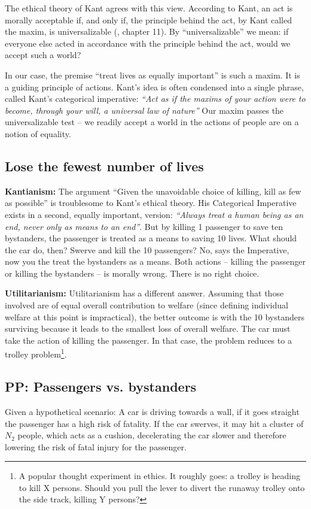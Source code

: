 The ethical theory of Kant agrees with this view. According to Kant, an act is morally acceptable if, and only if, the principle behind the act, by Kant called the maxim, is universalizable (\cite{Schafer}, chapter 11). By “universalizable” we mean: if everyone else acted in accordance with the principle behind the act, would we accept such a world?  

In our case, the premise “treat lives as equally important” is such a maxim. It is a guiding principle of actions. Kant’s idea is often condensed into a single phrase, called Kant’s categorical imperative: \textit{“Act as if the maxims of your action were to become, through your will, a universal law of nature”} Our maxim passes the universalizable test – we readily accept a world in the actions of people are on a notion of equality.


\subsection{Lose the fewest number of lives}
\textbf{Kantianism:} The argument “Given the unavoidable choice of killing, kill as few as possible” is troublesome to Kant’s ethical theory. His Categorical Imperative exists in a second, equally important, version: \textit{“Always treat a human being as an end, never only as means to an end”}. But by killing 1 passenger to save ten bystanders, the passenger is treated as a means to saving 10 lives. What should the car do, then? Swerve and kill the 10 passengers? No, says the Imperative, now you the treat the bystanders as a means.
Both actions – killing the passenger or killing the bystanders – is morally wrong. There is no right choice.

\textbf{Utilitarianism:} Utilitarianism has a different answer. Assuming that those involved are of equal overall contribution to welfare (since defining individual welfare at this point is impractical), the better outcome is with the 10 bystanders surviving because it leads to the smallest loss of overall welfare. The car must take the action of killing the passenger. In that case, the problem reduces to a trolley problem\footnote{A popular thought experiment in ethics. It roughly goes: a trolley is heading to kill X persons. Should you pull the lever to divert the runaway trolley onto the side track, killing Y persons?}.

\subsection{PP: Passengers vs. bystanders}
Given a hypothetical scenario: A car is driving towards a wall, if it goes straight the passenger has a high risk of fatality. If the car swerves, it may hit a cluster of $N_2$ people, which acts as a cushion, decelerating the car slower and therefore lowering the risk of fatal injury for the passenger.

